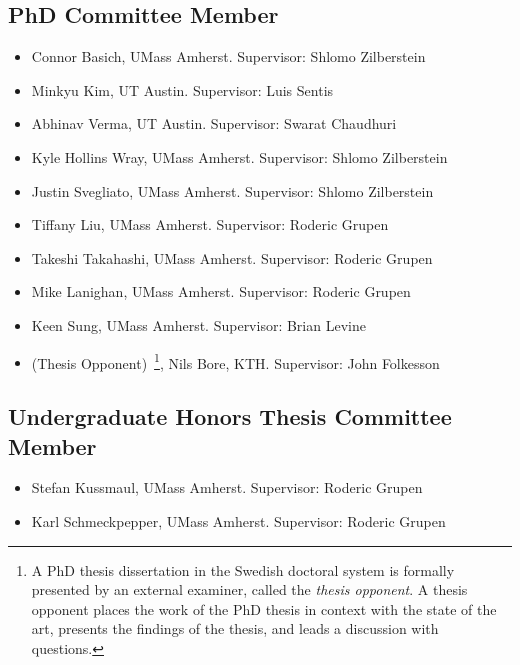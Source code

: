 \documentclass[Times]{article}
\begin{document}
\subsection*{PhD Committee Member}
\begin{itemize}
  \item Connor Basich, UMass Amherst. Supervisor: Shlomo Zilberstein
  \item Minkyu Kim, UT Austin. Supervisor: Luis Sentis
  \item Abhinav Verma, UT Austin. Supervisor: Swarat Chaudhuri
  \item Kyle Hollins Wray, UMass Amherst. Supervisor: Shlomo Zilberstein
  \item Justin Svegliato, UMass Amherst. Supervisor: Shlomo Zilberstein
  \item Tiffany Liu, UMass Amherst. Supervisor: Roderic Grupen
  \item Takeshi Takahashi, UMass Amherst. Supervisor: Roderic Grupen
  \item Mike Lanighan, UMass Amherst. Supervisor: Roderic Grupen
  \item Keen Sung, UMass Amherst. Supervisor: Brian Levine
  \item (Thesis Opponent)~\footnote{A PhD thesis dissertation in the Swedish
  doctoral system
is formally presented by an external examiner, called the \emph{thesis
opponent}. A thesis opponent places the work of the PhD thesis in context with
the state of the art, presents the findings of the thesis, and leads a
discussion with questions.}, Nils Bore, KTH. Supervisor: John Folkesson
\end{itemize}

\subsection*{Undergraduate Honors Thesis Committee Member}
\begin{itemize}
  \item Stefan Kussmaul, UMass Amherst. Supervisor: Roderic Grupen
  \item Karl Schmeckpepper, UMass Amherst. Supervisor: Roderic Grupen
\end{itemize}


\nocite{*}
\printbibheading
\bibbycategory
\end{document}
